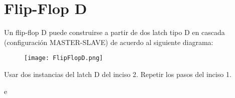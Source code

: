 \section{Flip-Flop D \label{sec:s3}}

\begin{center}
	\begin{minipage}{12cm}
		\begin{tcolorbox}[title=Actividad 3]
			 Un flip-flop D puede construirse a partir de dos latch tipo D en cascada (configuración MASTER-SLAVE) de acuerdo al siguiente diagrama:
			 \begin{figure}[ht]
			 	\centering
			 	\texttt{[image: FlipFlopD.png]}
			 \end{figure}
			 Usar dos instancias del latch D del inciso 2. Repetir los pasos del inciso 1.
		\end{tcolorbox}	
	\end{minipage}
\end{center}

e